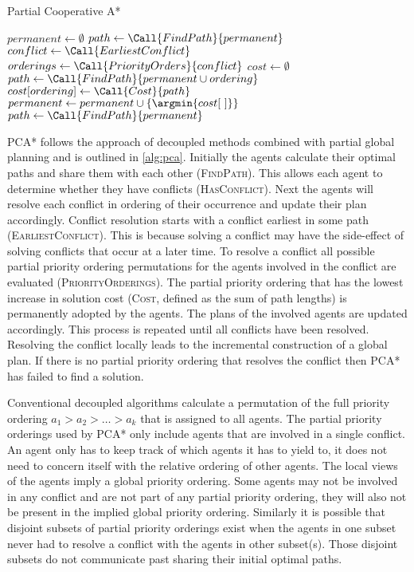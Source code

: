 \begin{algorithm}[t]
	\caption{Partial Cooperative A*}
	\label{alg:pca}
	\begin{algorithmic}[1]
		\State $permanent \gets \emptyset$
		\State $path \gets \Call{FindPath}{permanent}$
			\State $conflict \gets \Call{EarliestConflict}$
			\State $orderings \gets \Call{PriorityOrders}{conflict}$ 
			\State $cost \gets \emptyset$
				\State $path \gets \Call{FindPath}{permanent \cup ordering}$
				\State $cost[ordering] \gets \Call{Cost}{path}$
			\EndFor
			\State $permanent \gets permanent \cup \{ \argmin{cost[~]} \}$
			\State $path \gets \Call{FindPath}{permanent}$
		\EndWhile
	\end{algorithmic}
\end{algorithm}

PCA* follows the approach of decoupled methods combined with partial 
global planning and is outlined in \autoref{alg:pca}. Initially the agents 
calculate their optimal paths and share them with each other (\textsc{FindPath}). This allows
each agent to determine whether they have conflicts (\textsc{HasConflict}). Next the
agents will resolve each conflict in ordering of their occurrence and update 
their 
plan accordingly. Conflict resolution starts with a conflict earliest in some path (\textsc{EarliestConflict}). This is because solving a conflict may have the 
side-effect of solving conflicts that occur at a later time. To resolve a 
conflict all possible partial priority ordering permutations for the agents 
involved in the conflict are evaluated (\textsc{PriorityOrderings}). The partial priority ordering that has 
the 
lowest increase in solution cost (\textsc{Cost}, defined as the sum of path lengths) is permanently adopted 
by the agents. The plans of the involved agents are updated accordingly. This 
process is repeated until all conflicts have been resolved. Resolving the 
conflict locally leads to the incremental construction of a global plan. If 
there is no partial priority ordering that resolves the conflict then PCA* has 
failed to find a solution.

Conventional decoupled algorithms calculate a permutation of the full priority 
ordering $a_1 > a_2 > \ldots > a_k$ that is assigned to all agents.
The partial priority orderings used by PCA* only include agents that are 
involved in a single conflict.
An agent only has to keep track of which 
agents it has to yield to, it does not need to concern itself with the 
relative ordering of other agents. 
The local views of the agents imply a global priority ordering.
Some agents may not be involved 
in any conflict and are not part of any partial priority ordering, 
they will also not be present in the implied global priority ordering. 
Similarly 
it is possible that disjoint subsets of partial priority orderings exist when 
the 
agents in one subset never had to resolve a conflict with the agents in
other subset(s). Those disjoint subsets do not communicate past 
sharing their initial optimal paths.


